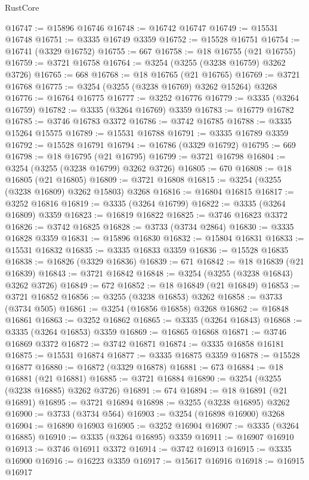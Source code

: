 \begin{lexlean}{RustCore}
\begin{coremodule}
@16747 := @15896 @16746
@16748 := @16742 @16747
@16749 := @15531 @16748
@16751 := @3335 @16749 @3359
@16752 := @15528 @16751
@16754 := @16741 (@3329 @16752)
@16755 := 667
@16758 := @18 @16755 (@21 @16755)
@16759 := @3721 @16758
@16764 := @3254 (@3255 (@3238 @16759) @3262 @3726)
@16765 := 668
@16768 := @18 @16765 (@21 @16765)
@16769 := @3721 @16768
@16775 := @3254 (@3255 (@3238 @16769) @3262 @15264) @3268
@16776 := @16764 @16775
@16777 := @3252 @16776
@16779 := @3335 (@3264 @16759)
@16782 := @3335 (@3264 @16769) @3359
@16783 := @16779 @16782
@16785 := @3746 @16783 @3372
@16786 := @3742 @16785
@16788 := @3335 @15264 @15575
@16789 := @15531 @16788
@16791 := @3335 @16789 @3359
@16792 := @15528 @16791
@16794 := @16786 (@3329 @16792)
@16795 := 669
@16798 := @18 @16795 (@21 @16795)
@16799 := @3721 @16798
@16804 := @3254 (@3255 (@3238 @16799) @3262 @3726)
@16805 := 670
@16808 := @18 @16805 (@21 @16805)
@16809 := @3721 @16808
@16815 := @3254 (@3255 (@3238 @16809) @3262 @15803) @3268
@16816 := @16804 @16815
@16817 := @3252 @16816
@16819 := @3335 (@3264 @16799)
@16822 := @3335 (@3264 @16809) @3359
@16823 := @16819 @16822
@16825 := @3746 @16823 @3372
@16826 := @3742 @16825
@16828 := @3733 (@3734 @2864)
@16830 := @3335 @16828 @3359
@16831 := @15896 @16830
@16832 := @15804 @16831
@16833 := @15531 @16832
@16835 := @3335 @16833 @3359
@16836 := @15528 @16835
@16838 := @16826 (@3329 @16836)
@16839 := 671
@16842 := @18 @16839 (@21 @16839)
@16843 := @3721 @16842
@16848 := @3254 (@3255 (@3238 @16843) @3262 @3726)
@16849 := 672
@16852 := @18 @16849 (@21 @16849)
@16853 := @3721 @16852
@16856 := @3255 (@3238 @16853) @3262
@16858 := @3733 (@3734 @505)
@16861 := @3254 (@16856 @16858) @3268
@16862 := @16848 @16861
@16863 := @3252 @16862
@16865 := @3335 (@3264 @16843)
@16868 := @3335 (@3264 @16853) @3359
@16869 := @16865 @16868
@16871 := @3746 @16869 @3372
@16872 := @3742 @16871
@16874 := @3335 @16858 @16181
@16875 := @15531 @16874
@16877 := @3335 @16875 @3359
@16878 := @15528 @16877
@16880 := @16872 (@3329 @16878)
@16881 := 673
@16884 := @18 @16881 (@21 @16881)
@16885 := @3721 @16884
@16890 := @3254 (@3255 (@3238 @16885) @3262 @3726)
@16891 := 674
@16894 := @18 @16891 (@21 @16891)
@16895 := @3721 @16894
@16898 := @3255 (@3238 @16895) @3262
@16900 := @3733 (@3734 @564)
@16903 := @3254 (@16898 @16900) @3268
@16904 := @16890 @16903
@16905 := @3252 @16904
@16907 := @3335 (@3264 @16885)
@16910 := @3335 (@3264 @16895) @3359
@16911 := @16907 @16910
@16913 := @3746 @16911 @3372
@16914 := @3742 @16913
@16915 := @3335 @16900
@16916 := @16223 @3359
@16917 := @15617 @16916
@16918 := @16915 @16917

\end{coremodule}
\end{lexlean}
